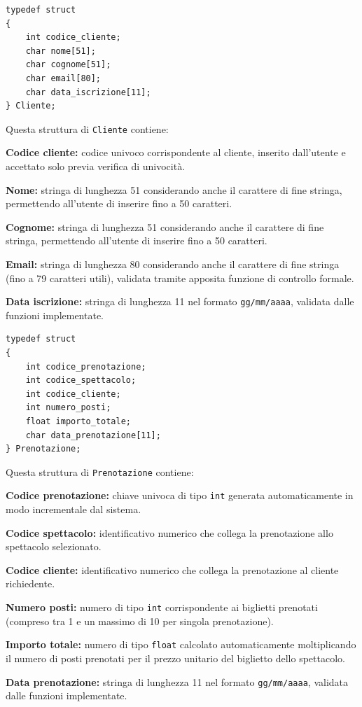 \documentclass[11pt,a4paper,oneside,openany]{book}
\newenvironment{listacomp}{%
    \small
    \begin{list}{\textendash}{%
        \setlength{\topsep}{2pt}%
        \setlength{\partopsep}{0pt}%
        \setlength{\itemsep}{1pt}%
        \setlength{\parsep}{0pt}%
        \setlength{\leftmargin}{1.2em}%
    }%
}{%
    \end{list}%
}
\begin{document}
\begin{lstlisting}[caption={Definizione della struttura Cliente}]
typedef struct
{
    int codice_cliente;
    char nome[51];
    char cognome[51];
    char email[80];
    char data_iscrizione[11];
} Cliente;
\end{lstlisting}
Questa struttura di \texttt{Cliente} contiene:
\begin{listacomp}
    \item \textbf{Codice cliente:} codice univoco corrispondente al cliente, inserito dall'utente e accettato solo previa verifica di univocità.
    \item \textbf{Nome:} stringa di lunghezza 51 considerando anche il carattere di fine stringa, permettendo all'utente di inserire fino a 50 caratteri.
    \item \textbf{Cognome:} stringa di lunghezza 51 considerando anche il carattere di fine stringa, permettendo all'utente di inserire fino a 50 caratteri.
    \item \textbf{Email:} stringa di lunghezza 80 considerando anche il carattere di fine stringa (fino a 79 caratteri utili), validata tramite apposita funzione di controllo formale.
    \item \textbf{Data iscrizione:} stringa di lunghezza 11 nel formato \texttt{gg/mm/aaaa}, validata dalle funzioni implementate.
\end{listacomp}

\begin{lstlisting}[caption={Definizione della struttura Prenotazione}]
typedef struct
{
    int codice_prenotazione;
    int codice_spettacolo;
    int codice_cliente;
    int numero_posti;
    float importo_totale;
    char data_prenotazione[11];
} Prenotazione;
\end{lstlisting}
Questa struttura di \texttt{Prenotazione} contiene:
\begin{listacomp}
    \item \textbf{Codice prenotazione:} chiave univoca di tipo \texttt{int} generata automaticamente in modo incrementale dal sistema.
    \item \textbf{Codice spettacolo:} identificativo numerico che collega la prenotazione allo spettacolo selezionato.
    \item \textbf{Codice cliente:} identificativo numerico che collega la prenotazione al cliente richiedente.
    \item \textbf{Numero posti:} numero di tipo \texttt{int} corrispondente ai biglietti prenotati (compreso tra 1 e un massimo di 10 per singola prenotazione).
    \item \textbf{Importo totale:} numero di tipo \texttt{float} calcolato automaticamente moltiplicando il numero di posti prenotati per il prezzo unitario del biglietto dello spettacolo.
    \item \textbf{Data prenotazione:} stringa di lunghezza 11 nel formato \texttt{gg/mm/aaaa}, validata dalle funzioni implementate.
\end{listacomp}
\end{document}

